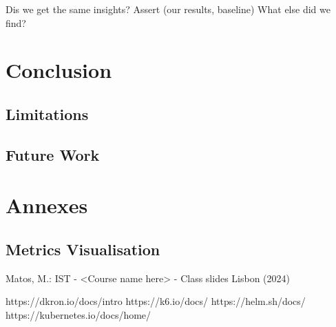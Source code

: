 \documentclass[runningheads]{llncs}
\begin{document}
Dis we get the same insights? Assert (our results, baseline)
What else did we find?

\section{Conclusion}

\subsection{Limitations}

\subsection{Future Work}

\section{Annexes}



\subsection{Metrics Visualisation}




%
%
% 
% 
%
\begin{thebibliography}{8}

Matos, M.: IST - <Course name here> - Class slides
Lisbon (2024)

https://dkron.io/docs/intro
https://k6.io/docs/
https://helm.sh/docs/
https://kubernetes.io/docs/home/
\end{thebibliography}
\end{document}
